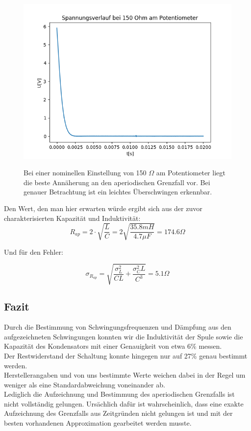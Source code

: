 \documentclass[12pt,a4paper]{article}
\begin{document}
\begin{figure}
\begin{center}
\includegraphics[scale=0.7]{Bilder/Spannungsverlauf150Ohm}
\label{fig:Aperiodisch}
\caption{Bei einer nominellen Einstellung von 150 $\Omega$ am Potentiometer liegt die beste Annäherung an den aperiodischen Grenzfall vor. Bei genauer Betrachtung ist ein leichtes Überschwingen erkennbar.}
\end{center}
\end{figure}


Den Wert, den man hier erwarten würde ergibt sich aus der zuvor charakterisierten Kapazität und Induktivität:
\begin{equation}
R_{ap}=2\cdot \sqrt{\frac{L}{C}}=2\sqrt{\frac{35.8mH}{4.7\mu F}}=174.6\Omega
\end{equation}

Und für den Fehler:

\begin{equation}
\sigma_{R_{ap}}=\sqrt{\frac{\sigma_L^2}{CL}+\frac{\sigma_C^2 L}{C^3}}=5.1 \Omega
\end{equation}



\subsection{Fazit}
Durch die Bestimmung von Schwingungsfrequenzen und Dämpfung aus den aufgezeichneten Schwingungen konnten wir die Induktivität der Spule sowie die Kapazität des Kondensators mit einer Genauigkeit von etwa 6\% messen.\\
Der Restwiderstand der Schaltung konnte hingegen nur auf 27\% genau bestimmt werden.\\
Herstellerangaben und von uns bestimmte Werte weichen dabei in der Regel um weniger als eine Standardabweichung voneinander ab.\\
Lediglich die Aufzeichnung und Bestimmung des aperiodischen Grenzfalls ist nicht vollständig gelungen. Ursächlich dafür ist wahrscheinlich, dass eine exakte Aufzeichnung des Grenzfalls aus Zeitgründen nicht gelungen ist und mit der besten vorhandenen Approximation gearbeitet werden musste.
\end{document}
